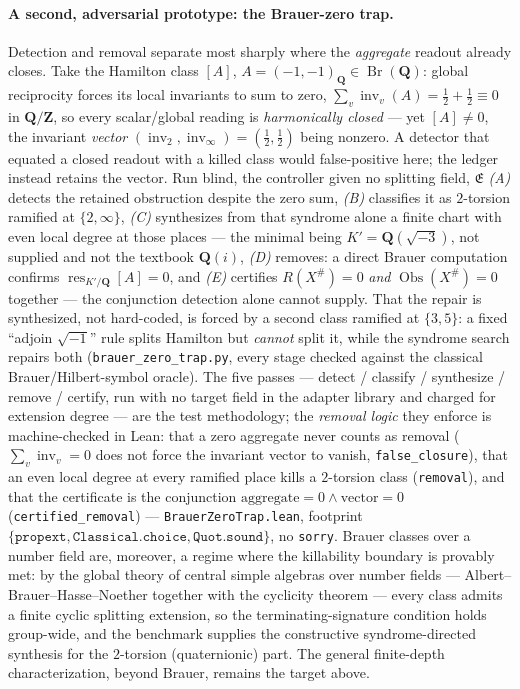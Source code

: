 \documentclass[11pt]{article}
\theoremstyle{definition}
\begin{document}
\paragraph{A second, adversarial prototype: the Brauer-zero trap.} Detection and removal separate most
sharply where the \emph{aggregate} readout already closes. Take the Hamilton class $[A]$,
$A=(-1,-1)_{\mathbf Q}\in\operatorname{Br}(\mathbf Q)$: global reciprocity forces its local invariants to sum to
zero, $\sum_v\operatorname{inv}_v(A)=\tfrac12+\tfrac12\equiv0$ in $\mathbf Q/\mathbf Z$, so every scalar/global
reading is \emph{harmonically closed} --- yet $[A]\neq0$, the invariant \emph{vector}
$(\operatorname{inv}_2,\operatorname{inv}_\infty)=(\tfrac12,\tfrac12)$ being nonzero. A detector that equated a
closed readout with a killed class would false-positive here; the ledger instead retains the vector. Run blind,
the controller given no splitting field, $\mathfrak E$ \emph{(A)} detects the retained obstruction despite the
zero sum, \emph{(B)} classifies it as $2$-torsion ramified at $\{2,\infty\}$, \emph{(C)} synthesizes from that
syndrome alone a finite chart with even local degree at those places --- the minimal being $K'=\mathbf
Q(\sqrt{-3})$, not supplied and not the textbook $\mathbf Q(i)$, \emph{(D)} removes: a direct Brauer computation
confirms $\operatorname{res}_{K'/\mathbf Q}[A]=0$, and \emph{(E)} certifies $R(X^\#)=0$ \emph{and}
$\operatorname{Obs}(X^\#)=0$ together --- the conjunction detection alone cannot supply. That the repair is
synthesized, not hard-coded, is forced by a second class ramified at $\{3,5\}$: a fixed ``adjoin $\sqrt{-1}$'' rule
splits Hamilton but \emph{cannot} split it, while the syndrome search repairs both (\texttt{brauer\_zero\_trap.py},
every stage checked against the classical Brauer/Hilbert-symbol oracle). The five passes --- detect / classify / synthesize / remove / certify, run with no target field in the adapter library and charged for extension degree --- are the test methodology; the \emph{removal logic} they enforce is machine-checked in Lean: that a zero aggregate never counts as removal ($\sum_v\operatorname{inv}_v=0$ does not force the invariant vector to vanish, \texttt{false\_closure}), that an even local degree at every ramified place kills a $2$-torsion class (\texttt{removal}), and that the certificate is the conjunction $\text{aggregate}=0\wedge\text{vector}=0$ (\texttt{certified\_removal}) --- \texttt{BrauerZeroTrap.lean}, footprint $\{\texttt{propext},\texttt{Classical.choice},\texttt{Quot.sound}\}$, no \texttt{sorry}. Brauer classes over a number field are,
moreover, a regime where the killability boundary is provably met: by the global theory of central simple
algebras over number fields --- Albert--Brauer--Hasse--Noether together with the cyclicity theorem --- every
class admits a finite cyclic splitting extension, so the terminating-signature condition holds group-wide, and the benchmark
supplies the constructive syndrome-directed synthesis for the $2$-torsion (quaternionic) part. The general
finite-depth characterization, beyond Brauer, remains the target above.
\end{document}
